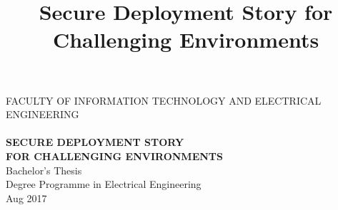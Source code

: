 \documentclass[a4paper,12pt,titlepage]{dithesis}
\title{Secure Deployment Story for Challenging Environments}
\begin{document}
\begin{titlepage}
	{{\small FACULTY OF INFORMATION TECHNOLOGY AND ELECTRICAL ENGINEERING}\\}
	\vspace{65 mm}
	{\textbf{\LARGE \getfirstname\ \getlastname}\\}
	\vspace{15 mm}
	{\textbf{\LARGE SECURE DEPLOYMENT STORY\\FOR CHALLENGING ENVIRONMENTS\\}}
	\vspace{70 mm}
	{\large {Bachelor's Thesis}\\}
	{\large {Degree Programme in Electrical Engineering}\\}
	{\large {Aug 2017}\\}
\end{titlepage}

\end{document}
